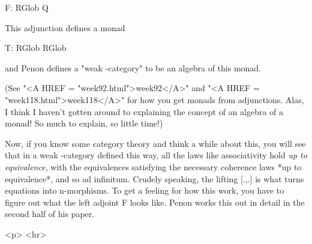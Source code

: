 F: RGlob \to  Q

This adjunction defines a monad

T: RGlob \to  RGlob 

and Penon defines a "weak \omega -category" to be an algebra of this
monad.  

(See "<A HREF = "week92.html">week92</A>" and "<A HREF = "week118.html">week118</A>" for how you get monads from adjunctions.
Alas, I think I haven't gotten around to explaining the concept of an
algebra of a monad!  So much to explain, so little time!)

Now, if you know some category theory and think a while about this,
you will see that in a weak \omega -category defined this way, all
the laws like associativity hold \emph{up to equivalence}, with the
equivalences satisfying the necessary coherence laws *up to 
equivalence*, and so ad infinitum.  Crudely speaking, the 
lifting [.,.] is what turns equations into n-morphisms.  To get
a feeling for how this work, you have to figure out what the left
adjoint F looks like.  Penon works this out in detail in the second
half of his paper.  

<p> <hr>



